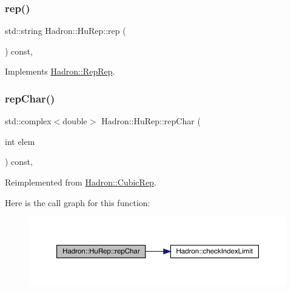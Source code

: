 \mbox{\label{structHadron_1_1HuRep_a4c8b93e1cd7db1a4bacd489f7bb90dbd}} 
\subsubsection{\texorpdfstring{rep()}{rep()}\hspace{0.1cm}{\footnotesize\ttfamily [3/3]}}
{\footnotesize\ttfamily std\+::string Hadron\+::\+Hu\+Rep\+::rep (\begin{DoxyParamCaption}{ }\end{DoxyParamCaption}) const\hspace{0.3cm}{\ttfamily [inline]}, {\ttfamily [virtual]}}



Implements \mbox{\hyperlink{structHadron_1_1RepRep_ab3213025f6de249f7095892109575fde}{Hadron\+::\+Rep\+Rep}}.

\mbox{\label{structHadron_1_1HuRep_a764617bf3dabef7cd69ffa034e550fff}} 
\subsubsection{\texorpdfstring{repChar()}{repChar()}\hspace{0.1cm}{\footnotesize\ttfamily [1/2]}}
{\footnotesize\ttfamily std\+::complex$<$double$>$ Hadron\+::\+Hu\+Rep\+::rep\+Char (\begin{DoxyParamCaption}\item[{int}]{elem }\end{DoxyParamCaption}) const\hspace{0.3cm}{\ttfamily [inline]}, {\ttfamily [virtual]}}



Reimplemented from \mbox{\hyperlink{structHadron_1_1CubicRep_af45227106e8e715e84b0af69cd3b36f8}{Hadron\+::\+Cubic\+Rep}}.

Here is the call graph for this function\+:
\nopagebreak
\begin{figure}[H]
\begin{center}
\leavevmode
\includegraphics[width=350pt]{d9/dd4/structHadron_1_1HuRep_a764617bf3dabef7cd69ffa034e550fff_cgraph}
\end{center}
\end{figure}
\mbox{\label{structHadron_1_1HuRep_a764617bf3dabef7cd69ffa034e550fff}} 
